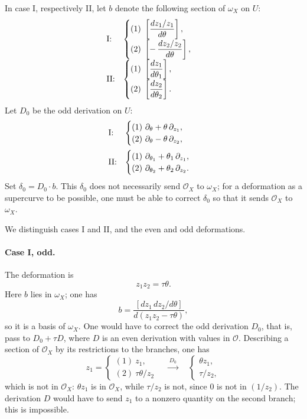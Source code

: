 \documentclass[11pt]{article}
\newcommand{\OO}{\mathcal O}
\begin{document}
In case I, respectively II, let $b$ denote the following section of $\omega_X$ on $U$:
\[
\begin{array}{ll}
\text{\rm I:}&
\begin{cases}
(1)\ \left[\dfrac{dz_1/z_1}{d\theta}\right],\\[2mm]
(2)\ \left[-\,\dfrac{dz_2/z_2}{d\theta}\right],
\end{cases}
\\[6mm]
\text{\rm II:}&
\begin{cases}
(1)\ \left[\dfrac{dz_1}{d\theta_1}\right],\\[2mm]
(2)\ \left[\dfrac{dz_2}{d\theta_2}\right].
\end{cases}
\end{array}
\]
Let $D_0$ be the odd derivation on $U$:
\[
\begin{array}{ll}
\text{\rm I:}&
\begin{cases}
(1)\ \partial_\theta+\theta\,\partial_{z_1},\\
(2)\ \partial_\theta-\theta\,\partial_{z_2},
\end{cases}
\\[5mm]
\text{\rm II:}&
\begin{cases}
(1)\ \partial_{\theta_1}+\theta_1\,\partial_{z_1},\\
(2)\ \partial_{\theta_2}+\theta_2\,\partial_{z_2}.
\end{cases}
\end{array}
\]
Set $\delta_0=D_0\cdot b$. This $\delta_0$ does not necessarily send $\OO_X$ to $\omega_X$; for a deformation as a supercurve to be possible, one must be able to correct $\delta_0$ so that it sends $\OO_X$ to $\omega_X$.

We distinguish cases I and II, and the even and odd deformations.

\paragraph{Case I, odd.}
The deformation is
\[
  z_1z_2=\tau\theta .
\]
Here $b$ lies in $\omega_X$; one has
\[
  b=\frac{\left[dz_1\,dz_2/d\theta\right]}{d(z_1z_2-\tau\theta)},
\]
so it is a basis of $\omega_X$. One would have to correct the odd derivation $D_0$, that is, pass to $D_0+\tau D$, where $D$ is an even derivation with values in $\OO$. Describing a section of $\OO_X$ by its restrictions to the branches, one has
\[
z_1=
\begin{cases}
(1)\ z_1,\\
(2)\ \tau\theta/z_2
\end{cases}
\quad \xrightarrow{\ D_0\ }\quad
\begin{cases}
\theta z_1,\\
\tau/z_2 ,
\end{cases}
\]
which is not in $\OO_X$: $\theta z_1$ is in $\OO_X$, while $\tau/z_2$ is not, since $0$ is not in $(1/z_2)$. The derivation $D$ would have to send $z_1$ to a nonzero quantity on the second branch; this is impossible.
\end{document}
